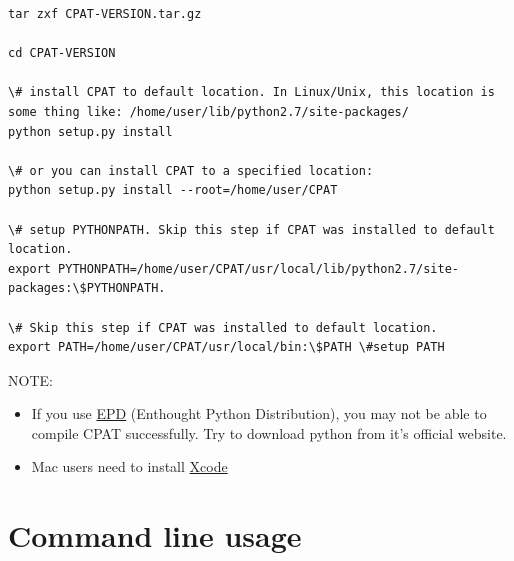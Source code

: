 \documentclass[letterpaper,10pt,english]{sphinxmanual}
\begin{document}
\begin{Verbatim}[commandchars=\\\{\}]
tar zxf CPAT-VERSION.tar.gz

cd CPAT-VERSION

\# install CPAT to default location. In Linux/Unix, this location is some thing like: /home/user/lib/python2.7/site-packages/
python setup.py install

\# or you can install CPAT to a specified location:
python setup.py install --root=/home/user/CPAT

\# setup PYTHONPATH. Skip this step if CPAT was installed to default location.
export PYTHONPATH=/home/user/CPAT/usr/local/lib/python2.7/site-packages:\$PYTHONPATH.

\# Skip this step if CPAT was installed to default location.
export PATH=/home/user/CPAT/usr/local/bin:\$PATH \#setup PATH
\end{Verbatim}

NOTE:
\begin{itemize}
\item {} 
If you use \href{http://www.enthought.com/products/epd.php}{EPD} (Enthought Python Distribution), you may not be able to compile CPAT successfully. Try to download python from it's official website.

\item {} 
Mac users need to install \href{https://developer.apple.com/xcode/}{Xcode}

\end{itemize}


\chapter{Command line usage}
\label{index:command-line-usage}
\end{document}
